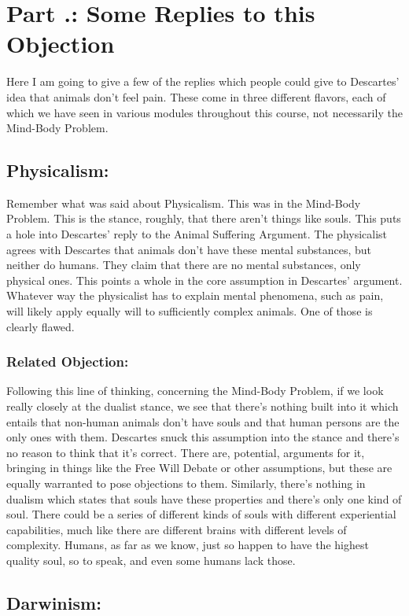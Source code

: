\section{Part \thechapcount.\theseccount: Some Replies to this Objection}

Here I am going to give a few of the replies which people could give to Descartes' idea that animals don't feel pain. These come in three different flavors, each of which we have seen in various modules throughout this course, not necessarily the Mind-Body Problem.
\subsection{Physicalism:}

Remember what was said about Physicalism. This was in the Mind-Body Problem. This is the stance, roughly, that there aren't things like souls. This puts a hole into Descartes' reply to the Animal Suffering Argument. The physicalist agrees with Descartes that animals don't have these mental substances, but neither do humans. They claim that there are no mental substances, only physical ones. This points a whole in the core assumption in Descartes' argument. Whatever way the physicalist has to explain mental phenomena, such as pain, will likely apply equally will to sufficiently complex animals.  One of those is clearly flawed.
\subsubsection{Related Objection:}

Following this line of thinking, concerning the Mind-Body Problem, if we look really closely at the dualist stance, we see that there's nothing built into it which entails that non-human animals don't have souls and that human persons are the only ones with them. Descartes snuck this assumption into the stance and there's no reason to think that it's correct. There are, potential, arguments for it, bringing in things like the Free Will Debate or other assumptions, but these are equally warranted to pose objections to them. Similarly, there's nothing in dualism which states that souls have these properties and there's only one kind of soul. There could be a series of different kinds of souls with different experiential capabilities, much like there are different brains with different levels of complexity. Humans, as far as we know, just so happen to have the highest quality soul, so to speak, and even some humans lack those. 
\subsection{Darwinism:}

